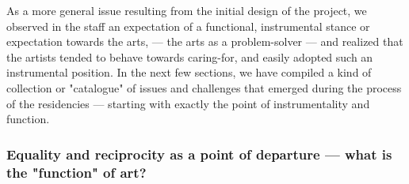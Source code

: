 \documentclass[authordate, empirical]{jote-new-article}
\begin{document}
{	As a more general issue resulting from the initial design of the project, we observed in the staff an expectation of a functional, instrumental stance or expectation towards the arts, --- the arts as a problem-solver --- and realized that the artists tended to behave towards caring-for, and easily adopted such an instrumental position. In the next few sections, we have compiled a kind of collection or "catalogue" of issues and challenges that emerged during the process of the residencies --- starting with exactly the point of instrumentality and function.




	}


	\subsubsection{Equality and reciprocity as a point of departure --- what is the "function" of art?}
\end{document}
